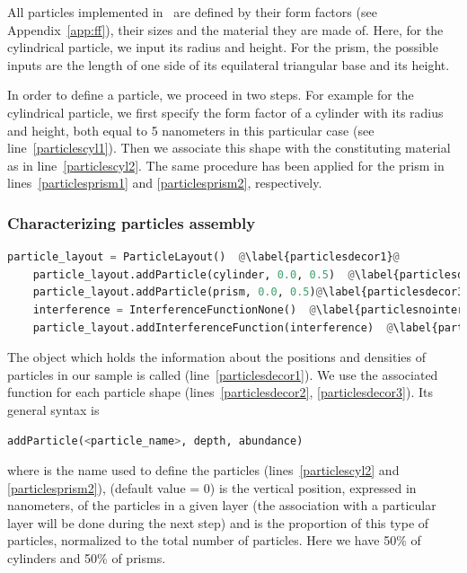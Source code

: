 All particles implemented in \BornAgain\ are defined by their
form factors (see Appendix~\ref{app:ff}), their sizes and the material
they are made of. Here, for the
cylindrical particle, we input its radius and height.  For the prism, 
the possible inputs are the length of one side of its equilateral triangular
base and its height.

In order to define a particle, we proceed in two steps. For example for
the cylindrical particle, we first specify the form factor of a cylinder with 
its radius and height, both equal to 5 nanometers in this particular
case (see line~\ref{particlescyl1}). Then we associate this shape with
the constituting material as in line~\ref{particlescyl2}.
The same procedure has been applied for the prism in lines~\ref{particlesprism1} and \ref{particlesprism2}, respectively.

\subsubsection{Characterizing particles assembly} 
\begin{lstlisting}[language=python, style=eclipseboxed, name=ex1,nolol]
    particle_layout = ParticleLayout()  @\label{particlesdecor1}@
    particle_layout.addParticle(cylinder, 0.0, 0.5)  @\label{particlesdecor2}@
    particle_layout.addParticle(prism, 0.0, 0.5)@\label{particlesdecor3}@
    interference = InterferenceFunctionNone()  @\label{particlesnointerf}@
    particle_layout.addInterferenceFunction(interference)  @\label{particlesinterf}@
\end{lstlisting}
The object which holds the information about the positions and densities of particles
in our sample is called 
(line~\ref{particlesdecor1}). We use the associated function 
for each particle shape (lines~\ref{particlesdecor2}, \ref{particlesdecor3}). Its general syntax is 

\begin{lstlisting}[language=python, style=eclipse,numbers=none]
addParticle(<particle_name>, depth, abundance) 
\end{lstlisting}
where  is the name used to define the particles
(lines~\ref{particlescyl2} and \ref{particlesprism2}), 
(default value = 0)
is the vertical position, expressed in nanometers, of the particles in a given layer (the
association with a particular layer will be done during the next step) and
 is the proportion of this type of particles, 
normalized to the total number of particles. Here we have 50\% of cylinders
and 50\% of prisms.

